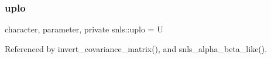 \mbox{\label{namespacesnls_a770d0a9cd7d82539ec94f8d27bb13c53}} 
\subsubsection{\texorpdfstring{uplo}{uplo}}
{\footnotesize\ttfamily character, parameter, private snls\+::uplo = \textquotesingle{}U\textquotesingle{}\hspace{0.3cm}{\ttfamily [private]}}



Referenced by invert\+\_\+covariance\+\_\+matrix(), and snls\+\_\+alpha\+\_\+beta\+\_\+like().

